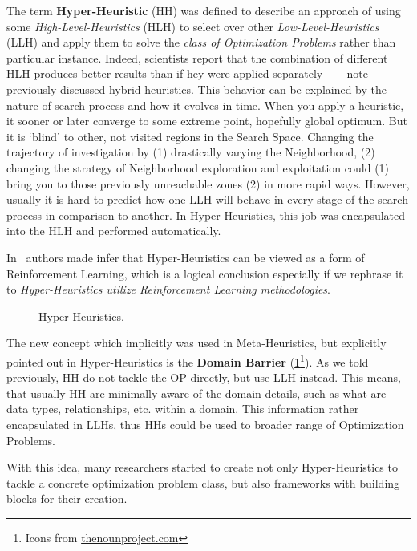 The term \textbf{Hyper-Heuristic} (HH) was defined to describe an approach of using some \textit{High-Level-Heuristics} (HLH) to select over other \textit{Low-Level-Heuristics} (LLH) and apply them to solve the \textit{class of Optimization Problems} rather than particular instance. Indeed, scientists report that the combination of different HLH produces better results than if hey were applied separately~\cite{drake2019recent} — note previously discussed hybrid-heuristics.
This behavior can be explained by the nature of search process and how it evolves in time. When you apply a heuristic, it sooner or later converge to some extreme point, hopefully global optimum. But it is `blind' to other, not visited regions in the Search Space. Changing the trajectory of investigation by (1) drastically varying the Neighborhood, (2) changing the strategy of Neighborhood exploration and exploitation could (1) bring you to those previously unreachable zones (2) in more rapid ways. However, usually it is hard to predict how one LLH will behave in every stage of the search process in comparison to another. In Hyper-Heuristics, this job was encapsulated into the HLH and performed automatically. 

In~\cite{moriarty1999evolutionary} authors made infer that Hyper-Heuristics can be viewed as a form of Reinforcement Learning, which is a logical conclusion especially if we rephrase it to \textit{Hyper-Heuristics utilize Reinforcement Learning methodologies}.

\begin{figure}
	\centering
	
	\caption[Hyper-Heuristics]{Hyper-Heuristics.}
	\label{bg:pic:HH}
\end{figure}

The new concept which implicitly was used in Meta-Heuristics, but explicitly pointed out in Hyper-Heuristics is the \textbf{Domain Barrier} (\cref{bg:pic:HH}\footnote{Icons from \href{https://thenounproject.com/}{thenounproject.com}}).
As we told previously, HH do not tackle the OP directly, but use LLH instead. This means, that usually HH are minimally aware of the domain details, such as what are data types, relationships, etc. within a domain. This information rather encapsulated in LLHs, thus HHs could be used to broader range of Optimization Problems.

With this idea, many researchers started to create not only Hyper-Heuristics to tackle a concrete optimization problem class, but also frameworks with building blocks for their creation.


